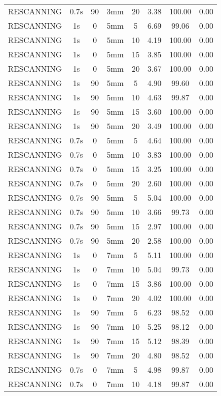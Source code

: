 \begin{table}[H]
\begin{tabular}{|c||c|c|c|c||c|c|c|}
RESCANNING & 0.7s & 90 & 3mm & 20 & 3.38 & 100.00 & 0.00 \\
RESCANNING & 1s & 0 & 5mm & 5 & 6.69 & 99.06 & 0.00 \\
RESCANNING & 1s & 0 & 5mm & 10 & 4.19 & 100.00 & 0.00 \\
RESCANNING & 1s & 0 & 5mm & 15 & 3.85 & 100.00 & 0.00 \\
RESCANNING & 1s & 0 & 5mm & 20 & 3.67 & 100.00 & 0.00 \\
RESCANNING & 1s & 90 & 5mm & 5 & 4.90 & 99.60 & 0.00 \\
RESCANNING & 1s & 90 & 5mm & 10 & 4.63 & 99.87 & 0.00 \\
RESCANNING & 1s & 90 & 5mm & 15 & 3.60 & 100.00 & 0.00 \\
RESCANNING & 1s & 90 & 5mm & 20 & 3.49 & 100.00 & 0.00 \\
RESCANNING & 0.7s & 0 & 5mm & 5 & 4.64 & 100.00 & 0.00 \\
RESCANNING & 0.7s & 0 & 5mm & 10 & 3.83 & 100.00 & 0.00 \\
RESCANNING & 0.7s & 0 & 5mm & 15 & 3.25 & 100.00 & 0.00 \\
RESCANNING & 0.7s & 0 & 5mm & 20 & 2.60 & 100.00 & 0.00 \\
RESCANNING & 0.7s & 90 & 5mm & 5 & 5.04 & 100.00 & 0.00 \\
RESCANNING & 0.7s & 90 & 5mm & 10 & 3.66 & 99.73 & 0.00 \\
RESCANNING & 0.7s & 90 & 5mm & 15 & 2.97 & 100.00 & 0.00 \\
RESCANNING & 0.7s & 90 & 5mm & 20 & 2.58 & 100.00 & 0.00 \\
RESCANNING & 1s & 0 & 7mm & 5 & 5.11 & 100.00 & 0.00 \\
RESCANNING & 1s & 0 & 7mm & 10 & 5.04 & 99.73 & 0.00 \\
RESCANNING & 1s & 0 & 7mm & 15 & 3.86 & 100.00 & 0.00 \\
RESCANNING & 1s & 0 & 7mm & 20 & 4.02 & 100.00 & 0.00 \\
RESCANNING & 1s & 90 & 7mm & 5 & 6.23 & 98.52 & 0.00 \\
RESCANNING & 1s & 90 & 7mm & 10 & 5.25 & 98.12 & 0.00 \\
RESCANNING & 1s & 90 & 7mm & 15 & 5.12 & 98.39 & 0.00 \\
RESCANNING & 1s & 90 & 7mm & 20 & 4.80 & 98.52 & 0.00 \\
RESCANNING & 0.7s & 0 & 7mm & 5 & 4.98 & 99.87 & 0.00 \\
RESCANNING & 0.7s & 0 & 7mm & 10 & 4.18 & 99.87 & 0.00 \\

\end{tabular}
\end{table}
